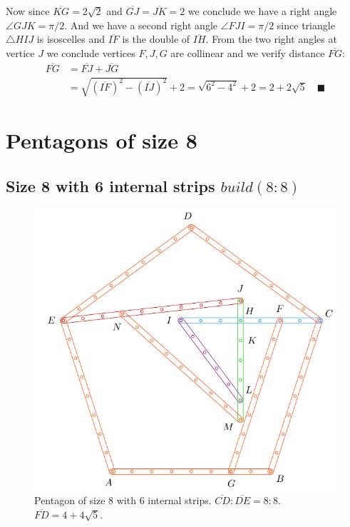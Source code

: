\documentclass[11pt]{article}
\begin{document}
Now since $\overline{KG} = 2\sqrt2$ and $\overline{GJ} = \overline{JK} = 2$ we conclude we have a right angle $\angle{GJK} = \pi / 2.$ And we have a second right angle $\angle{FJI} = \pi/2$ since triangle $\triangle{HIJ}$ is isoscelles and $\overline{IF}$ is the double of $\overline{IH}$. From the two right angles at vertice $J$ we conclude vertices $F,J,G$ are collinear and we verify distance $\overline{FG}$:
\begin{align}
\overline{FG} &= \overline{FJ} + \overline{JG} \nonumber\\
 &= \sqrt{(\overline{IF})^2 - (\overline{IJ})^2} + 2
 = \sqrt{6^2 - 4^2} + 2 = 2 + 2\sqrt5 \quad \blacksquare
\end{align}


\section{Pentagons of size 8}

\subsection{Size 8 with 6 internal strips $build(8:8)$}

\begin{figure}[h]
\centering
\includegraphics[scale=1]{8/penta8-6a}
\caption{Pentagon of size 8 with 6 internal strips. $\overline{CD} : \overline{DE} = 8:8$. $\overline{FD} = 4 + 4\sqrt5$.}
\label{fig:penta8-6a}
\end{figure}
\end{document}
